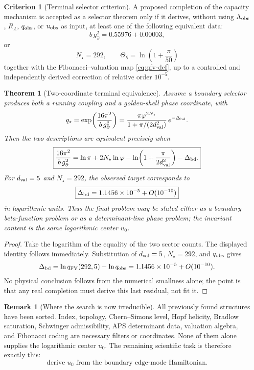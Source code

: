 \documentclass[aps,prd,reprint,nofootinbib,superscriptaddress,floatfix]{revtex4-2}
\numberwithin{equation}{section}
\theoremstyle{definition}
\newtheorem{criterion}{Criterion}[section]
\newtheorem{remark}{Remark}[section]
\theoremstyle{plain}
\newtheorem{theorem}{Theorem}[section]
\begin{document}
\begin{criterion}[Terminal selector criterion]
A proposed completion of the capacity mechanism is accepted as a
selector theorem only if it derives, without using \(\Lambda_{\rm obs}\),
\(R_\Lambda\), \(q_{\rm obs}\), or \(u_{\rm obs}\) as input, at least one of
the following equivalent data:
\[
\boxed{
b\,g_\partial^2=0.55976\pm0.00003 ,
}
\]
or
\[
\boxed{
N_\star=292,
\qquad
\Theta_\partial=\ln\!\left(1+\frac{\pi}{50}\right)
}
\]
together with the Fibonacci--valuation map \cref{eq:qfv-def}, up to a
controlled and independently derived correction of relative order
\(10^{-5}\).
\end{criterion}

\begin{theorem}[Two-coordinate terminal equivalence]
Assume a boundary selector produces both a running coupling and a
golden-shell phase coordinate, with
\[
q_\star
=
\exp\!\left(\frac{16\pi^2}{b\,g_\partial^2}\right)
=
\frac{\pi\varphi^{2N_\star}}{1+\pi/(2d_{\rm val}^2)}
\,e^{-\Delta_{\rm bd}} .
\]
Then the two descriptions are equivalent precisely when
\begin{equation}
\boxed{
\frac{16\pi^2}{b\,g_\partial^2}
=
\ln\pi+2N_\star\ln\varphi
-\ln\!\left(1+\frac{\pi}{2d_{\rm val}^2}\right)
-\Delta_{\rm bd}.
}
\end{equation}
For \(d_{\rm val}=5\) and \(N_\star=292\), the observed target corresponds
to
\[
\boxed{
\Delta_{\rm bd}=1.1456\times10^{-5}+O(10^{-10})
}
\]
in logarithmic units.  Thus the final problem may be stated either as a
boundary beta-function problem or as a determinant-line phase problem;
the invariant content is the same logarithmic center \(u_0\).
\end{theorem}

\begin{proof}
Take the logarithm of the equality of the two sector counts.  The
displayed identity follows immediately.  Substitution of \(d_{\rm val}=5\),
\(N_\star=292\), and \(q_{\rm obs}\) gives
\[
\Delta_{\rm bd}
=
\ln q_{\rm FV}(292,5)-\ln q_{\rm obs}
=
1.1456\times10^{-5}+O(10^{-10}).
\]
No physical conclusion follows from the numerical smallness alone; the
point is that any real completion must derive this last residual, not fit
it.
\end{proof}

\begin{remark}[Where the search is now irreducible]
All previously found structures have been sorted.  Index, topology,
Chern--Simons level, Hopf helicity, Bradlow saturation, Schwinger
admissibility, APS determinant data, valuation algebra, and Fibonacci
coding are necessary filters or coordinates.  None of them alone supplies
the logarithmic center \(u_0\).  The remaining scientific task is therefore
exactly this:
\[
\boxed{
\text{derive }u_0
\text{ from the boundary edge-mode Hamiltonian.}
}
\]
\end{remark}
\end{document}
